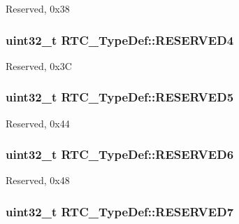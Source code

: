 Reserved, 0x38 \hypertarget{struct_r_t_c___type_def_a541e93bdbd07770ebc448412f3456877}{
\subsubsection[{R\-E\-S\-E\-R\-V\-E\-D4}]{\setlength{\rightskip}{0pt plus 5cm}uint32\-\_\-t R\-T\-C\-\_\-\-Type\-Def\-::\-R\-E\-S\-E\-R\-V\-E\-D4}}\label{struct_r_t_c___type_def_a541e93bdbd07770ebc448412f3456877}
Reserved, 0x3\-C \hypertarget{struct_r_t_c___type_def_a12ca87774a5947ec10cbc9feb13e6de6}{
\subsubsection[{R\-E\-S\-E\-R\-V\-E\-D5}]{\setlength{\rightskip}{0pt plus 5cm}uint32\-\_\-t R\-T\-C\-\_\-\-Type\-Def\-::\-R\-E\-S\-E\-R\-V\-E\-D5}}\label{struct_r_t_c___type_def_a12ca87774a5947ec10cbc9feb13e6de6}
Reserved, 0x44 \hypertarget{struct_r_t_c___type_def_ae3991ef129a612831298cffd6b750307}{
\subsubsection[{R\-E\-S\-E\-R\-V\-E\-D6}]{\setlength{\rightskip}{0pt plus 5cm}uint32\-\_\-t R\-T\-C\-\_\-\-Type\-Def\-::\-R\-E\-S\-E\-R\-V\-E\-D6}}\label{struct_r_t_c___type_def_ae3991ef129a612831298cffd6b750307}
Reserved, 0x48 \hypertarget{struct_r_t_c___type_def_a09936292ef8d82974b55a03a1080534e}{
\subsubsection[{R\-E\-S\-E\-R\-V\-E\-D7}]{\setlength{\rightskip}{0pt plus 5cm}uint32\-\_\-t R\-T\-C\-\_\-\-Type\-Def\-::\-R\-E\-S\-E\-R\-V\-E\-D7}}\label{struct_r_t_c___type_def_a09936292ef8d82974b55a03a1080534e}
